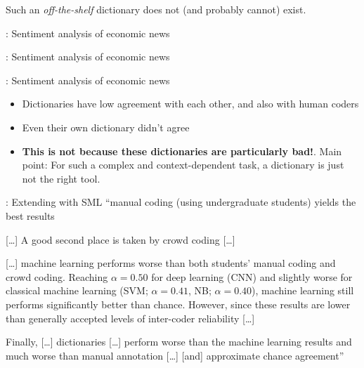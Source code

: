 \begin{frame}[standout]
  Such an \textit{off-the-shelf} dictionary does not (and probably cannot) exist.
\end{frame}



\begin{frame}{\cite{Boukes2020}: Sentiment analysis of economic news}
\end{frame}


\begin{frame}{\cite{Boukes2020}: Sentiment analysis of economic news}
\end{frame}


\begin{frame}{\cite{Boukes2020}: Sentiment analysis of economic news}
  \begin{itemize}
  \item Dictionaries have low agreement with each other, and also with human coders
  \item Even their own dictionary didn't agree
  \item \textbf{This is not because these dictionaries are particularly bad!}. Main point: For such a complex and context-dependent task, a dictionary is just not the right tool.
  \end{itemize}
\end{frame}




\begin{frame}{\cite{VanAtteveldt2021}: Extending \cite{Boukes2020} with SML}
  ``manual coding (using undergraduate students) yields the
  best results 
  
  [\ldots] A good second place is taken by crowd coding [\ldots]  
  
  
  [\ldots] machine learning performs worse than both students' manual coding and crowd coding.
  Reaching $\alpha = 0.50$ for deep learning (CNN) and slightly worse for classical machine learning (SVM; $\alpha = 0.41$, NB; $\alpha = 0.40$), machine learning still performs significantly better than chance. However, since these results are lower than generally accepted levels of inter-coder reliability [\ldots]
  
  Finally, [\ldots] dictionaries [\ldots] perform worse than the machine
  learning results and much worse than manual annotation [\ldots] [and] approximate chance agreement''\end{frame}

